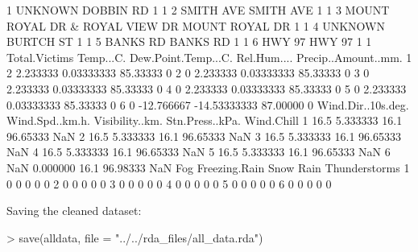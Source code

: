 \documentclass[11pt, a4paper]{article}
\begin{document}
\begin{Schunk}
\begin{Soutput}
1                        UNKNOWN        DOBBIN RD               1             1
2                      SMITH AVE        SMITH AVE               1             1
3 MOUNT ROYAL DR & ROYAL VIEW DR   MOUNT ROYAL DR               1             1
4                        UNKNOWN        BURTCH ST               1             1
5                       BANKS RD         BANKS RD               1             1
6                         HWY 97           HWY 97               1             1
  Total.Victims  Temp...C. Dew.Point.Temp...C. Rel.Hum.... Precip..Amount..mm.
1             2   2.233333          0.03333333    85.33333                   0
2             0   2.233333          0.03333333    85.33333                   0
3             0   2.233333          0.03333333    85.33333                   0
4             0   2.233333          0.03333333    85.33333                   0
5             0   2.233333          0.03333333    85.33333                   0
6             0 -12.766667        -14.53333333    87.00000                   0
  Wind.Dir..10s.deg. Wind.Spd..km.h. Visibility..km. Stn.Press..kPa. Wind.Chill
1               16.5        5.333333            16.1        96.65333        NaN
2               16.5        5.333333            16.1        96.65333        NaN
3               16.5        5.333333            16.1        96.65333        NaN
4               16.5        5.333333            16.1        96.65333        NaN
5               16.5        5.333333            16.1        96.65333        NaN
6                NaN        0.000000            16.1        96.98333        NaN
  Fog Freezing.Rain Snow Rain Thunderstorms
1   0             0    0    0             0
2   0             0    0    0             0
3   0             0    0    0             0
4   0             0    0    0             0
5   0             0    0    0             0
6   0             0    0    0             0
\end{Soutput}
\end{Schunk}




Saving the cleaned dataset:

\begin{Schunk}
\begin{Sinput}
> save(alldata, file = "../../rda_files/all_data.rda")
\end{Sinput}
\end{Schunk}
\end{document}
